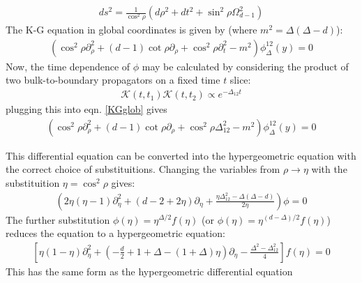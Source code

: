   
  
 \begin{align*}
  ds^2=\frac{1}{\cos^2\rho} \left( d \rho^2 + dt^2 + \sin^2 \rho \Omega^2_{d-1} \right)
 \end{align*}
  The K-G equation in global coordinates is given by (where $m^2=\Delta(\Delta-d)$):
  \begin{align}
   \left( \cos^2 \rho \partial^2_\rho + (d-1)\cot \rho \partial_\rho + \cos^2 \rho \partial^2_t -m^2 \right) \phi^{12}_{\Delta}(y) = 0 \label{KGglob}
  \end{align}
  Now, the time dependence of $\phi$ may be calculated by considering the product of two bulk-to-boundary propagators on a fixed time $t$ slice:
  \begin{align*}
   \mathcal{K}(t,t_1) \mathcal{K}(t,t_2) \propto e^{-\Delta_{12}t}
  \end{align*}
  plugging this into eqn. \ref{KGglob} gives
  \begin{align}
   \left( \cos^2 \rho \partial^2_\rho + (d-1)\cot \rho \partial_\rho + \cos^2 \rho \Delta_{12}^2 -m^2 \right) \phi^{12}_{\Delta}(y) = 0 \label{KGglob1}
  \end{align}
  
  This differential equation can be converted into the hypergeometric equation with the correct choice of substituitions. Changing the variables from $\rho \to \eta$ with the substituition $\eta = \cos ^2 \rho$ gives:
  \begin{align}
   \left( 2 \eta (\eta-1)  \partial_\eta^2 + (d-2+2 \eta) \partial_\eta + \frac{\eta \Delta_{12}^2 - \Delta(\Delta-d) }{2\eta} \right) \phi = 0
  \end{align}
  The further substitution $\phi(\eta) = \eta^{\Delta/2} f(\eta)$ (or $\phi(\eta) = \eta^{(d-\Delta)/2} f(\eta)$) reduces the equation to a hypergeometric equation:
    \begin{align}
   \left[ \eta (1-\eta)  \partial_\eta^2 + \left(-\frac{d}{2}+1+\Delta -(1+\Delta)\eta\right) \partial_\eta - \frac{\Delta^2-\Delta_{12}^2}{4} \right] f(\eta) = 0
  \end{align}
  This has the same form as the hypergeometric differential equation
  
